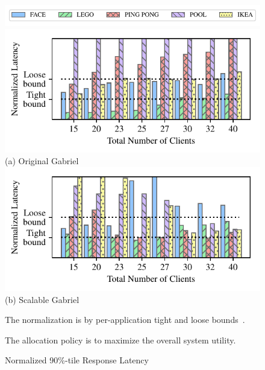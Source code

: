 \begin{figure}[]
  \begin{center}
    \includegraphics[width=\linewidth]{FIGS/fig-alloc-latency-legend.pdf}
    \includegraphics[width=\linewidth]{FIGS/fig-alloc-latency-baseline.pdf}
    {(a) Original Gabriel}
    \includegraphics[width=\linewidth]{FIGS/fig-alloc-latency-cpushares.pdf}
    {(b) Scalable Gabriel}
  \end{center}
\begin{captiontext}
  \centering
The normalization is  by per-application tight and loose
bounds~\cite{chen2017empirical}.

The allocation policy is to maximize the overall system utility.
\end{captiontext}
  \caption{Normalized 90\%-tile Response Latency}
  \label{fig:alloc-latency}
\end{figure}

